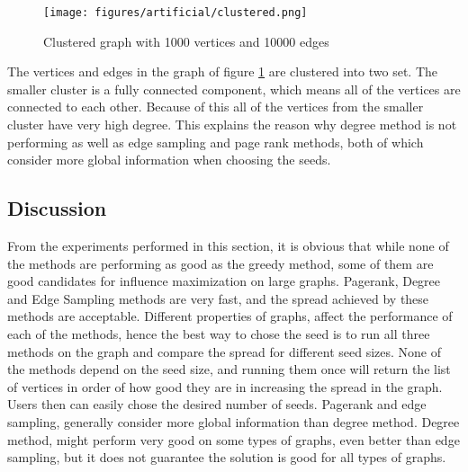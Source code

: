 \documentclass[english]{tktltiki}
\begin{document}
\begin{figure}[ht!]
\centering
\texttt{[image: figures/artificial/clustered.png]}
\caption{Clustered graph with 1000 vertices and 10000 edges}
\label{art:clustered}
\end{figure}

The vertices and edges in the graph of figure \ref{art:clustered} are clustered into two set. The smaller cluster is a fully connected component, which means all of the vertices are connected to each other. Because of this all of the vertices from the smaller cluster have very high degree. This explains the reason why degree method is not performing as well as edge sampling and page rank methods, both of which consider more global information when choosing the seeds.\\
\subsection{Discussion}
From the experiments performed in this section, it is obvious that while none of the methods are performing as good as the greedy method, some of them are good candidates for influence maximization on large graphs. Pagerank, Degree and Edge Sampling methods are very fast, and the spread achieved by these methods are acceptable. Different properties of graphs, affect the performance of each of the methods, hence the best way to chose the seed is to run all three methods on the graph and compare the spread for different seed sizes. None of the methods depend on the seed size, and running them once will return the list of vertices in order of how good they are in increasing the spread in the graph. Users then can easily chose the desired number of seeds. Pagerank and edge sampling, generally consider more global information than degree method. Degree method, might perform very good on some types of graphs, even better than edge sampling, but it does not guarantee the solution is good for all types of graphs. \\


\newpage
\end{document}
